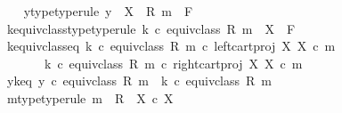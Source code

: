 \begin{isabellebody}
\ \ \isamarkupfalse%
\ y{\isacharunderscore}{\kern0pt}type{\isacharbrackleft}{\kern0pt}type{\isacharunderscore}{\kern0pt}rule{\isacharbrackright}{\kern0pt}{\isacharcolon}{\kern0pt}\ {\isachardoublequoteopen}y\ {\isacharcolon}{\kern0pt}\ X\ {\isasymsslash}\ {\isacharparenleft}{\kern0pt}R{\isacharcomma}{\kern0pt}\ m{\isacharparenright}{\kern0pt}\ {\isasymrightarrow}\ F{\isachardoublequoteclose}\isanewline
\ \ \isamarkupfalse%
\ k{\isacharunderscore}{\kern0pt}equiv{\isacharunderscore}{\kern0pt}class{\isacharunderscore}{\kern0pt}type{\isacharbrackleft}{\kern0pt}type{\isacharunderscore}{\kern0pt}rule{\isacharbrackright}{\kern0pt}{\isacharcolon}{\kern0pt}\ {\isachardoublequoteopen}k\ {\isasymcirc}\isactrlsub c\ equiv{\isacharunderscore}{\kern0pt}class\ {\isacharparenleft}{\kern0pt}R{\isacharcomma}{\kern0pt}\ m{\isacharparenright}{\kern0pt}\ {\isacharcolon}{\kern0pt}\ X\ {\isasymrightarrow}\ F{\isachardoublequoteclose}\isanewline
\ \ \isamarkupfalse%
\ k{\isacharunderscore}{\kern0pt}equiv{\isacharunderscore}{\kern0pt}class{\isacharunderscore}{\kern0pt}eq{\isacharcolon}{\kern0pt}\ {\isachardoublequoteopen}{\isacharparenleft}{\kern0pt}k\ {\isasymcirc}\isactrlsub c\ equiv{\isacharunderscore}{\kern0pt}class\ {\isacharparenleft}{\kern0pt}R{\isacharcomma}{\kern0pt}\ m{\isacharparenright}{\kern0pt}{\isacharparenright}{\kern0pt}\ {\isasymcirc}\isactrlsub c\ left{\isacharunderscore}{\kern0pt}cart{\isacharunderscore}{\kern0pt}proj\ X\ X\ {\isasymcirc}\isactrlsub c\ m\ {\isacharequal}{\kern0pt}\isanewline
\ \ \ \ \ \ \ {\isacharparenleft}{\kern0pt}k\ {\isasymcirc}\isactrlsub c\ equiv{\isacharunderscore}{\kern0pt}class\ {\isacharparenleft}{\kern0pt}R{\isacharcomma}{\kern0pt}\ m{\isacharparenright}{\kern0pt}{\isacharparenright}{\kern0pt}\ {\isasymcirc}\isactrlsub c\ right{\isacharunderscore}{\kern0pt}cart{\isacharunderscore}{\kern0pt}proj\ X\ X\ {\isasymcirc}\isactrlsub c\ m{\isachardoublequoteclose}\isanewline
\ \ \isamarkupfalse%
\ y{\isacharunderscore}{\kern0pt}k{\isacharunderscore}{\kern0pt}eq{\isacharcolon}{\kern0pt}\ {\isachardoublequoteopen}y\ {\isasymcirc}\isactrlsub c\ equiv{\isacharunderscore}{\kern0pt}class\ {\isacharparenleft}{\kern0pt}R{\isacharcomma}{\kern0pt}\ m{\isacharparenright}{\kern0pt}\ {\isacharequal}{\kern0pt}\ k\ {\isasymcirc}\isactrlsub c\ equiv{\isacharunderscore}{\kern0pt}class\ {\isacharparenleft}{\kern0pt}R{\isacharcomma}{\kern0pt}\ m{\isacharparenright}{\kern0pt}{\isachardoublequoteclose}\isanewline
\isanewline
\ \ \isamarkupfalse%
\ m{\isacharunderscore}{\kern0pt}type{\isacharbrackleft}{\kern0pt}type{\isacharunderscore}{\kern0pt}rule{\isacharbrackright}{\kern0pt}{\isacharcolon}{\kern0pt}\ {\isachardoublequoteopen}m\ {\isacharcolon}{\kern0pt}\ R\ {\isasymrightarrow}\ X\ {\isasymtimes}\isactrlsub c\ X{\isachardoublequoteclose}\isanewline

\end{isabellebody}
